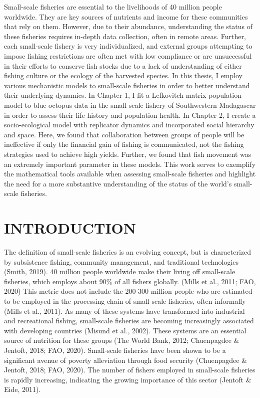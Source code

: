 \documentclass[
]{article}
\begin{document}
Small-scale fisheries are essential to the livelihoods of 40 million people worldwide. They are key sources of nutrients and income for these communities that rely on them. However, due to their abundance, understanding the status of these fisheries requires in-depth data collection, often in remote areas. Further, each small-scale fishery is very individualized, and external groups attempting to impose fishing restrictions are often met with low compliance or are unsuccessful in their efforts to conserve fish stocks due to a lack of understanding of either fishing culture or the ecology of the harvested species. In this thesis, I employ various mechanistic models to small-scale fisheries in order to better understand their underlying dynamics. In Chapter 1, I fit a Lefkovitch matrix population model to blue octopus data in the small-scale fishery of Southwestern Madagascar in order to assess their life history and population health. In Chapter 2, I create a socio-ecological model with replicator dynamics and incorporated social hierarchy and space. Here, we found that collaboration between groups of people will be ineffective if only the financial gain of fishing is communicated, not the fishing strategies used to achieve high yields. Further, we found that fish movement was an extremely important parameter in these models. This work serves to exemplify the mathematical tools available when assessing small-scale fisheries and highlight the need for a more substantive understanding of the status of the world's small-scale fisheries.

\newpage


\hypertarget{introduction}{%
\section{INTRODUCTION}\label{introduction}}

The definition of small-scale fisheries is an evolving concept, but is characterized by subsistence fishing, community management, and traditional technologies (Smith, 2019). 40 million people worldwide make their living off small-scale fisheries, which employs about 90\% of all fishers globally. (Mills et al., 2011; FAO, 2020) This metric does not include the 200-300 million people who are estimated to be employed in the processing chain of small-scale fisheries, often informally (Mills et al., 2011). As many of these systems have transformed into industrial and recreational fishing, small-scale fisheries are becoming increasingly associated with developing countries (Misund et al., 2002). These systems are an essential source of nutrition for these groups (The World Bank, 2012; Chuenpagdee \& Jentoft, 2018; FAO, 2020). Small-scale fisheries have been shown to be a significant avenue of poverty alleviation through food security (Chuenpagdee \& Jentoft, 2018; FAO, 2020). The number of fishers employed in small-scale fisheries is rapidly increasing, indicating the growing importance of this sector (Jentoft \& Eide, 2011).
\end{document}
